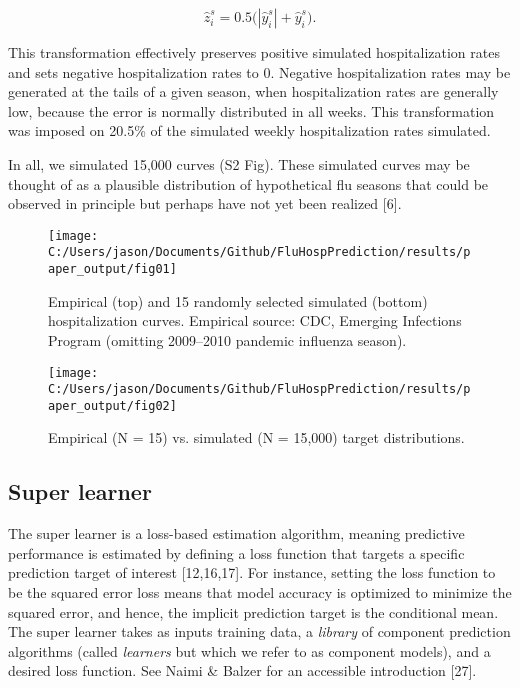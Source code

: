 \documentclass[10pt,letterpaper]{article}
\begin{document}
\[\hat{z}^s_i = 0.5 \bigg( | \hat{y}^s_i | + \hat{y}^s_i \bigg).\]

This transformation effectively preserves positive simulated
hospitalization rates and sets negative hospitalization rates to 0.
Negative hospitalization rates may be generated at the tails of a given
season, when hospitalization rates are generally low, because the error
is normally distributed in all weeks. This transformation was imposed on
20.5\% of the simulated weekly hospitalization rates simulated.

In all, we simulated 15,000 curves (S2 Fig). These simulated curves may
be thought of as a plausible distribution of hypothetical flu seasons
that could be observed in principle but perhaps have not yet been
realized {[}6{]}.

\begin{figure}
\texttt{[image: C:/Users/jason/Documents/Github/FluHospPrediction/results/paper\_output/fig01]} \caption{Empirical (top) and 15 randomly selected simulated (bottom) hospitalization curves. Empirical source: CDC, Emerging Infections Program (omitting 2009--2010 pandemic influenza season).}\label{fig:fig01-empsim-compare}
\end{figure}

\begin{figure}
\texttt{[image: C:/Users/jason/Documents/Github/FluHospPrediction/results/paper\_output/fig02]} \caption{Empirical (N = 15) vs. simulated (N = 15,000) target distributions.}\label{fig:fig02-simcompare}
\end{figure}

\hypertarget{super-learner}{%
\subsection{Super learner}\label{super-learner}}

The super learner is a loss-based estimation algorithm, meaning
predictive performance is estimated by defining a loss function that
targets a specific prediction target of interest {[}12,16,17{]}. For
instance, setting the loss function to be the squared error loss means
that model accuracy is optimized to minimize the squared error, and
hence, the implicit prediction target is the conditional mean. The super
learner takes as inputs training data, a \emph{library} of component
prediction algorithms (called \emph{learners} but which we refer to as
component models), and a desired loss function. See Naimi \& Balzer for
an accessible introduction {[}27{]}.
\end{document}
